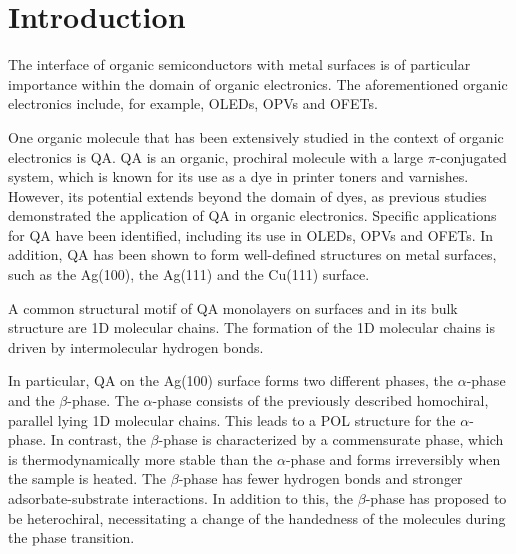 \chapter{Introduction}

The interface of organic semiconductors with metal surfaces is of particular importance within the domain of organic electronics. The aforementioned organic electronics include, for example, \acp{OLED}, \acp{OPV} and \acp{OFET}.\autocite{Koch2007}

One organic molecule that has been extensively studied in the context of organic electronics is \acf{QA}. \Ac{QA} is an organic, prochiral molecule with a large $\pi$-conjugated system, which is known for its use as a dye in printer toners and varnishes.\autocite{Hye2012} However, its potential extends beyond the domain of dyes, as previous studies demonstrated the application of \ac{QA} in organic electronics.\autocite{Glowacki2013, DanielGlowacki2012, Wang2016} Specific applications for \ac{QA} have been identified, including its use in \acp{OLED}\autocite{Wang2016a, Min2021, Cunha2018}, \acp{OPV}\autocite{Dunst2017, Sung2017} and \acp{OFET}\autocite{Jeon2018, Jeong2017, Kanbur2019, Berg2009}. In addition, \ac{QA} has been shown to form well-defined structures on metal surfaces, such as the Ag(100), the Ag(111) and the Cu(111) surface.\autocite{Humberg2020,Humberg2024,Humberg2023,Humberg2024a,Wagner2014}

A common structural motif of \ac{QA} monolayers on surfaces\autocite{Humberg2024, Wagner2014, Trixler2007, Eberle2019} and in its bulk structure\autocite{Paulus2007} are 1D molecular chains. The formation of the 1D molecular chains is driven by intermolecular hydrogen bonds.\autocite{Humberg2024, Humberg2020}

In particular, \ac{QA} on the Ag(100) surface forms two different phases, the $\alpha$-phase and the $\beta$-phase. The $\alpha$-phase consists of the previously described homochiral, parallel lying 1D molecular chains. This leads to a \ac{POL} structure for the $\alpha$-phase. In contrast, the $\beta$-phase is characterized by a commensurate phase, which is thermodynamically more stable than the $\alpha$-phase and forms irreversibly when the sample is heated. The $\beta$-phase has fewer hydrogen bonds and stronger adsorbate-substrate interactions. In addition to this, the $\beta$-phase has proposed to be heterochiral, necessitating a change of the handedness of the molecules during the phase transition.\autocite{Humberg2024, Humberg2020}

